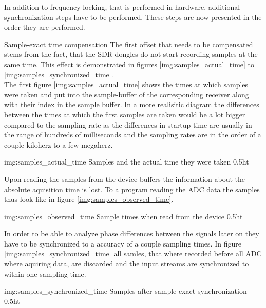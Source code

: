 In addition to frequency locking, that is performed in
hardware, additional synchronization steps have to
be performed. These steps are now presented in the
order they are performed. \\

\begin{subchapter}{Sample-exact time compensation}
  The first offset that needs to be compensated stems
  from the fact, that the SDR-dongles do not start
  recording samples at the same time.
  This effect is demonstrated in figures
  \ref{img:samples_actual_time} to \ref{img:samples_synchronized_time}. \\

  The first figure \ref{img:samples_actual_time} shows the
  times at which samples were taken and put into the
  sample-buffer of the corresponding receiver along
  with their index in the sample buffer.
  In a more realisitic diagram the differences between the
  times at which the first samples are taken would be
  a lot bigger compared to the sampling rate as the
  differences in startup time are usually in the range
  of hundreds of milliseconds and the sampling rates are
  in the order of a couple kiloherz to a few megaherz.

               {img:samples_actual_time}
               {Samples and the actual time they were taken}
               {0.5}{ht}

  Upon reading the samples from the device-buffers
  the information about the absolute aquisition time is
  lost. To a program reading the ADC data the
  samples thus look like in figure \ref{img:samples_observed_time}.

               {img:samples_observed_time}
               {Sample times when read from the device}
               {0.5}{ht}

  In order to be able to analyze phase differences between
  the signals later on they have to be synchronized to
  a accuracy of a couple sampling times.
  In figure \ref{img:samples_synchronized_time} all
  samles, that where recorded before all ADC where aquiring
  data, are discarded and the input streams are
  synchronized to within one sampling time.

               {img:samples_synchronized_time}
               {Samples after sample-exact synchronization}
               {0.5}{ht}


\end{subchapter}
